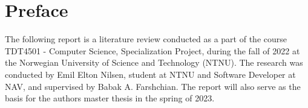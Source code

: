 \section*{Preface}
The following report is a literature review conducted as a part of the course TDT4501 - Computer Science, Specialization Project, during the fall of 2022 at the Norwegian University of Science and Technology (NTNU). The research was conducted by Emil Elton Nilsen, student at NTNU and Software Developer at NAV, and supervised by Babak A. Farshchian. The report will also serve as the basis for the authors master thesis in the spring of 2023.


\newpage